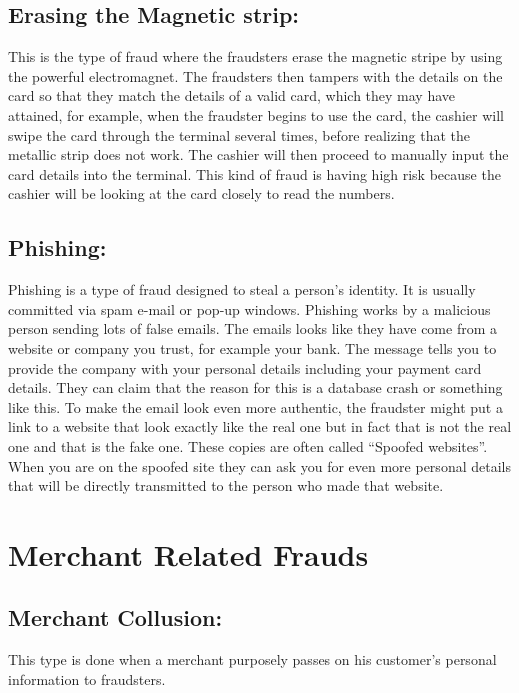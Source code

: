 \documentclass{report}
\begin{document}
\subsection{Erasing the Magnetic strip:}
This is the type of fraud where the fraudsters erase the magnetic stripe by using the powerful electromagnet. The fraudsters then tampers with the details on the card so that they match the details of a valid card, which they may have attained, for example, when the fraudster begins to use the card, the cashier will swipe the card through the terminal several times, before realizing that the metallic strip does not work. The cashier will then proceed to manually input the card details into the terminal. This kind of fraud is having high risk because the cashier will be looking at the card closely to read the numbers.

\subsection{Phishing:}
Phishing is a type of fraud designed to steal a person’s identity. It is usually committed via spam e-mail or pop-up windows. Phishing works by a malicious person sending lots of false emails. The emails looks like they have come from a website or company you trust, for example your bank. The message tells you to provide the company with your personal details including your payment card details. They can claim that the reason for this is a database crash or something like this. To make the email look even more authentic, the fraudster might put a link to a website that look exactly like the real one but in fact that is not the real one and that is the fake one. These copies are often called “Spoofed websites”. When you are on the spoofed site they can ask you for even more personal details that will be directly transmitted to the person who made that website.  

\section{Merchant Related Frauds}
\paragraph{}
\subsection{Merchant Collusion:}
This type is done when a merchant purposely passes on his customer’s personal information to fraudsters. 
\end{document}
